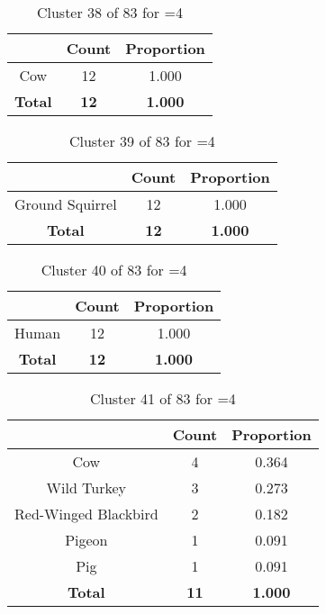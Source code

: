 \begin{table}[ht!]
\centering
\begin{tabular}{|c|c|c|}
\hline
\bf \Spec{} &\bf Count &\bf Proportion\\ \hline \hline
Cow & 12 & 1.000\\ \hline
\hline
\bf Total & \bf 12 & \bf 1.000\\ \hline
\end{tabular}
\label{tab:cluster:38:4}
\caption{Cluster 38 of 83 for \minneigh{}=4}
\end{table}

\begin{table}[ht!]
\centering
\begin{tabular}{|c|c|c|}
\hline
\bf \Spec{} &\bf Count &\bf Proportion\\ \hline \hline
Ground Squirrel & 12 & 1.000\\ \hline
\hline
\bf Total & \bf 12 & \bf 1.000\\ \hline
\end{tabular}
\label{tab:cluster:39:4}
\caption{Cluster 39 of 83 for \minneigh{}=4}
\end{table}

\clearpage
\begin{table}[ht!]
\centering
\begin{tabular}{|c|c|c|}
\hline
\bf \Spec{} &\bf Count &\bf Proportion\\ \hline \hline
Human & 12 & 1.000\\ \hline
\hline
\bf Total & \bf 12 & \bf 1.000\\ \hline
\end{tabular}
\label{tab:cluster:40:4}
\caption{Cluster 40 of 83 for \minneigh{}=4}
\end{table}

\begin{table}[ht!]
\centering
\begin{tabular}{|c|c|c|}
\hline
\bf \Spec{} &\bf Count &\bf Proportion\\ \hline \hline
Cow & 4 & 0.364\\ \hline
Wild Turkey & 3 & 0.273\\ \hline
Red-Winged Blackbird & 2 & 0.182\\ \hline
Pigeon & 1 & 0.091\\ \hline
Pig & 1 & 0.091\\ \hline
\hline
\bf Total & \bf 11 & \bf 1.000\\ \hline
\end{tabular}
\label{tab:cluster:41:4}
\caption{Cluster 41 of 83 for \minneigh{}=4}
\end{table}

